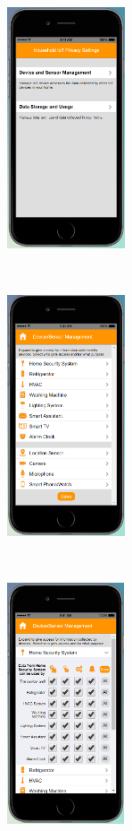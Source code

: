 \begin{figure}
	\centering
	\begin{subfigure}[t]{0.24\textwidth}
		\centering
		\includegraphics[height=2.8in]{figures/ui1allOff1.png}
	\end{subfigure}%
	~
	\begin{subfigure}[t]{0.24\textwidth}
		\centering
		\includegraphics[height=2.8in]{figures/ui1allOff2.png}
	\end{subfigure}%
	~
	\begin{subfigure}[t]{0.24\textwidth}
		\centering
		\includegraphics[height=2.8in]{figures/ui2allOn3.png}

\end{subfigure}
\end{figure}
